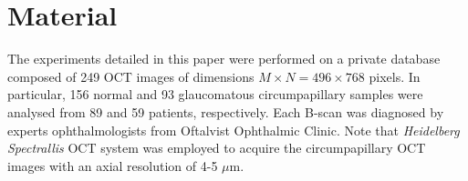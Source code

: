 \section{Material} \label{sec: Material}

The experiments detailed in this paper were performed on a private database composed of 249 OCT images of dimensions $M\times N=496\times768$ pixels. In particular, 156 normal and 93 glaucomatous circumpapillary samples were analysed from 89 and 59 patients, respectively. Each B-scan was diagnosed by experts ophthalmologists from Oftalvist Ophthalmic Clinic. Note that \textit{Heidelberg Spectrallis} OCT system was employed to acquire the circumpapillary OCT images with an axial resolution of 4-5 $\mu$m. 

